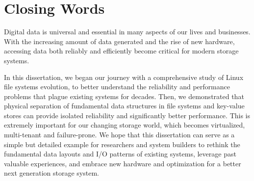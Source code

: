 \section{Closing Words}
\label{sec-conc-closing}

Digital data is universal and essential in many aspects of our
lives and businesses. With the increasing amount of data generated and
the rise of new hardware, accessing data both reliably and efficiently
become critical for modern storage systems.  

In this dissertation, we began our journey with a comprehensive study
of Linux file systems evolution, to better understand the reliability
and performance problems that plague existing systems for
decades. Then, we demonstrated that physical separation of fundamental 
data structures in file systems and key-value stores can provide
isolated reliability and significantly better performance.  This is
extremely important for our changing storage world, which becomes
virtualized, multi-tenant and failure-prone. We hope that this
dissertation can serve as a simple but detailed example for
researchers and system builders to rethink the fundamental data
layouts and I/O patterns of existing systems, leverage past valuable
experiences, and embrace new hardware and optimization for a better 
next generation storage system.
